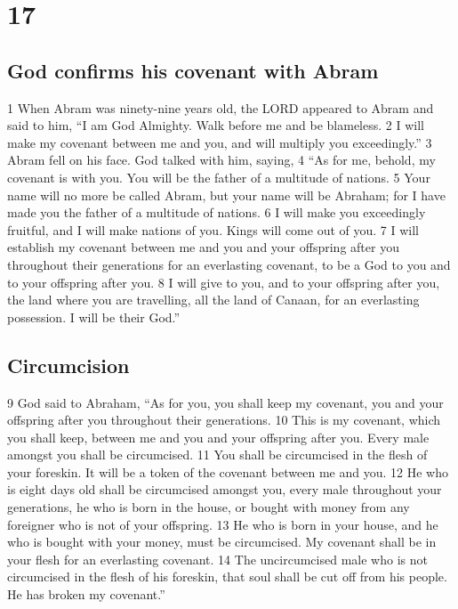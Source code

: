 \hypertarget{section-16}{%
\section{17}\label{section-16}}

\hypertarget{god-confirms-his-covenant-with-abram}{%
\subsection{God confirms his covenant with
Abram}\label{god-confirms-his-covenant-with-abram}}

{1} When Abram was ninety-nine years old, the LORD appeared to Abram and
said to him, ``I am God Almighty. Walk before me and be blameless. {2} I
will make my covenant between me and you, and will multiply you
exceedingly.'' {3} Abram fell on his face. God talked with him, saying,
{4} ``As for me, behold, my covenant is with you. You will be the father
of a multitude of nations. {5} Your name will no more be called Abram,
but your name will be Abraham; for I have made you the father of a
multitude of nations. {6} I will make you exceedingly fruitful, and I
will make nations of you. Kings will come out of you. {7} I will
establish my covenant between me and you and your offspring after you
throughout their generations for an everlasting covenant, to be a God to
you and to your offspring after you. {8} I will give to you, and to your
offspring after you, the land where you are travelling, all the land of
Canaan, for an everlasting possession. I will be their God.''

\hypertarget{circumcision}{%
\subsection{Circumcision}\label{circumcision}}

{9} God said to Abraham, ``As for you, you shall keep my covenant, you
and your offspring after you throughout their generations. {10} This is
my covenant, which you shall keep, between me and you and your offspring
after you. Every male amongst you shall be circumcised. {11} You shall
be circumcised in the flesh of your foreskin. It will be a token of the
covenant between me and you. {12} He who is eight days old shall be
circumcised amongst you, every male throughout your generations, he who
is born in the house, or bought with money from any foreigner who is not
of your offspring. {13} He who is born in your house, and he who is
bought with your money, must be circumcised. My covenant shall be in
your flesh for an everlasting covenant. {14} The uncircumcised male who
is not circumcised in the flesh of his foreskin, that soul shall be cut
off from his people. He has broken my covenant.''

